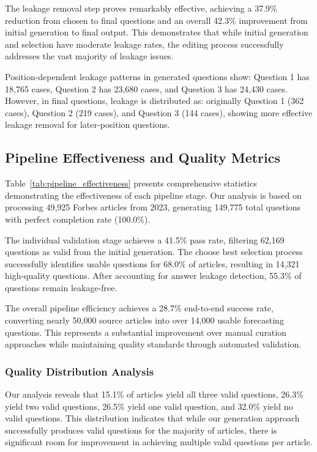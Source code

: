 The leakage removal step proves remarkably effective, achieving a 37.9\% reduction from chosen to final questions and an overall 42.3\% improvement from initial generation to final output. This demonstrates that while initial generation and selection have moderate leakage rates, the editing process successfully addresses the vast majority of leakage issues.

Position-dependent leakage patterns in generated questions show: Question 1 has 18,765 cases, Question 2 has 23,680 cases, and Question 3 has 24,430 cases. However, in final questions, leakage is distributed as: originally Question 1 (362 cases), Question 2 (219 cases), and Question 3 (144 cases), showing more effective leakage removal for later-position questions.

\subsection{Pipeline Effectiveness and Quality Metrics}
\label{subsec:effectiveness_metrics}

Table~\ref{tab:pipeline_effectiveness} presents comprehensive statistics demonstrating the effectiveness of each pipeline stage. Our analysis is based on processing 49,925 Forbes articles from 2023, generating 149,775 total questions with perfect completion rate (100.0\%).

The individual validation stage achieves a 41.5\% pass rate, filtering 62,169 questions as valid from the initial generation. The choose best selection process successfully identifies usable questions for 68.0\% of articles, resulting in 14,321 high-quality questions. After accounting for answer leakage detection, 55.3\% of questions remain leakage-free.

The overall pipeline efficiency achieves a 28.7\% end-to-end success rate, converting nearly 50,000 source articles into over 14,000 usable forecasting questions. This represents a substantial improvement over manual curation approaches while maintaining quality standards through automated validation.

\subsubsection{Quality Distribution Analysis}
Our analysis reveals that 15.1\% of articles yield all three valid questions, 26.3\% yield two valid questions, 26.5\% yield one valid question, and 32.0\% yield no valid questions. This distribution indicates that while our generation approach successfully produces valid questions for the majority of articles, there is significant room for improvement in achieving multiple valid questions per article.

